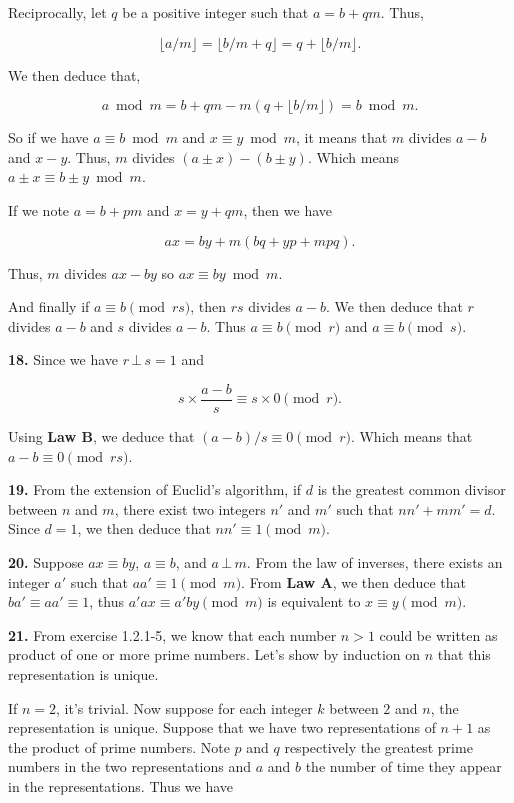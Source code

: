 \documentclass[a4paper,12pt]{article}
\newcommand{\newpar}[1]{\bigskip \noindent \textbf{#1.}}
\begin{document}
Reciprocally, let $q$ be a positive integer such that $a = b + q m$.
Thus,

\[ \lfloor a/m\rfloor = \lfloor b/m + q\rfloor = q + \lfloor
b/m\rfloor.\]

We then deduce that,

\[  a \bmod m = b + qm - m (q + \lfloor b/m\rfloor) = b \bmod m.\]

\medskip
So if we have $a \equiv b \bmod m$ and $x \equiv y \bmod m$, it means
that $m$ divides $a - b$ and $x - y$.  Thus, $m$ divides $(a \pm x) -
(b \pm y)$.  Which means $a \pm x \equiv b \pm y \bmod m$.

If we note $a = b + pm$ and $x = y + qm$, then we have

\[ a x = b y + m (bq + yp + mpq).\]

Thus, $m$ divides $ax - by$ so $ax \equiv by \bmod m$.

\medskip
And finally if $a \equiv b \pmod{rs}$, then $rs$ divides $a-b$.  We
then deduce that $r$ divides $a-b$ and $s$ divides $a-b$.  Thus $a
\equiv b \pmod{r}$ and $a \equiv b \pmod{s}$.

\newpar{18} Since we have $r\,\bot\, s = 1$ and

\[ s\times \frac{a - b}{s} \equiv s\times 0 \pmod{r}.\]

Using \textbf{Law B}, we deduce that $(a-b)/s \equiv 0 \pmod{r}$.
Which means that $a - b \equiv 0 \pmod{rs}$.

\newpar{19} From the extension of Euclid's algorithm, if $d$ is the
greatest common divisor between $n$ and $m$, there exist two integers
$n'$ and $m'$ such that $nn' + mm' = d$.  Since $d = 1$, we then
deduce that $n n' \equiv 1 \pmod{m}$.

\newpar{20} Suppose $ax \equiv by$, $a\equiv b$, and $a\,\bot\,m$.
From the law of inverses, there exists an integer $a'$ such that
$aa' \equiv 1 \pmod{m}$.  From \textbf{Law A}, we then deduce that $ba'
\equiv aa' \equiv 1$, thus $a'ax \equiv a'b y \pmod{m}$ is equivalent
to $x \equiv y \pmod{m}$.

\newpar{21}  From exercise 1.2.1-5, we know that each number $n > 1$
could be written as product of one or more prime numbers.  Let's show
by induction on $n$ that this representation is unique.

\medskip If $n=2$, it's trivial.  Now suppose for each integer $k$
between $2$ and $n$, the representation is unique.  Suppose that we
have two representations of $n+1$ as the product of prime numbers.
Note $p$ and $q$ respectively the greatest prime numbers in the two
representations and $a$ and $b$ the number of time they appear in the
representations.  Thus we have
\end{document}
